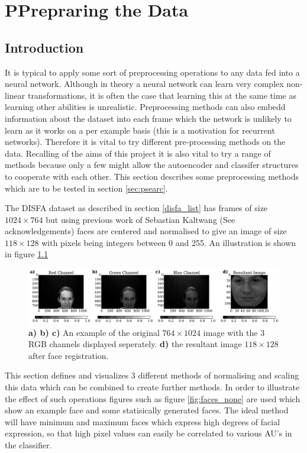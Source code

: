 \chapter{PPrepraring the Data}
\section{Introduction}
It is typical to apply some sort of preprocessing operations to any data fed into
a neural network. Although in theory a neural network can learn very complex
non-linear transformations, it is often the case that learning this at the same
time as learning other abilities is unrealistic. Preprocessing methods can
also embedd information about the dataset into each frame which the network is
unlikely to learn as it works on a per example basis (this is a motivation for
recurrent networks).
 Therefore it is vital to try
different pre-processing methods on the data.
Recalling of the aims of this project it is also vital to try a range of methods
because only a few
might allow the autoencoder and classifer structures to cooperate with each other.
This section describes some preprocessing methods which are to be
tested in section \ref{sec:psearc}.


The DISFA dataset as described in section \ref{disfa_list} has frames of size $ 1024 \times 764 $
but using previous work of Sebastian Kaltwang (See acknowledgements) faces are
centered and normalised to give an image of size $118 \times 128$
with pixels being integers between
0 and 255. An illustration is shown in figure \ref{fig:sebproc}

\begin{figure}[!h] \centering
\includegraphics[width =\hsize]{figures/seb_preproc.pdf}
\caption{ {\bf a) b) c)} An example of the original $764 \times 1024$ image with
the 3 RGB channels displayed seperately. {\bf d)} the resultant image
$118 \times 128$ after face registration.} \label{fig:sebproc} \end{figure}

This section defines and visualizes 3 different methods of normalising and scaling
this data which can be combined to create further methods. In order to illustrate
the effect of such operations figures such as figure \ref{fig:faces_none} are used which
show an example face and some statisically generated faces. The ideal method will
have minimum and maximum faces which express high degrees of facial expression, so that
high pixel values can easily be correlated to various AU's in the classifier.

